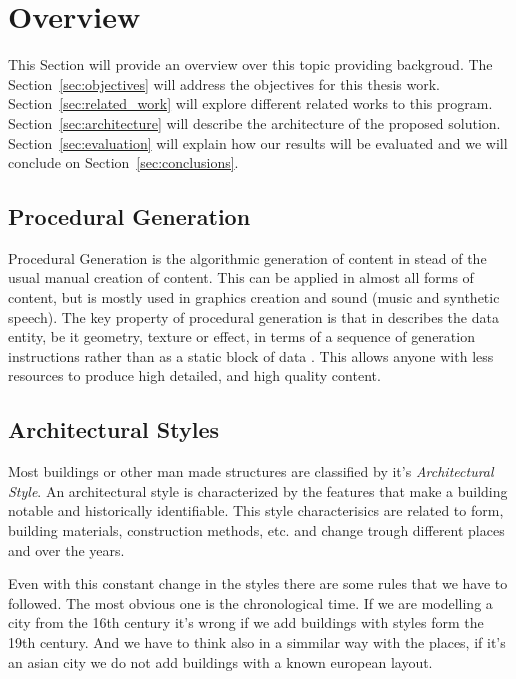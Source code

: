 
% 
% 

\section{Overview} %
\label{sec:overview}


This Section will provide an overview over this topic providing backgroud. The Section~\ref{sec:objectives} will address the objectives for this thesis work. Section~\ref{sec:related_work} will explore different related works to this program. Section~\ref{sec:architecture} will describe the architecture of the proposed solution. Section~\ref{sec:evaluation} will explain how our results will be evaluated and we will conclude on Section~\ref{sec:conclusions}.

\subsection{Procedural Generation} %
\label{sub:procedural_generation}


Procedural Generation is the algorithmic generation of content in stead of the usual manual creation of content. This can be applied in almost all forms of content, but is mostly used in graphics creation and sound (music and synthetic speech).
The key property of procedural generation is that in describes the data entity, be it geometry, texture or effect, in terms of a sequence of generation instructions rather than as a static block of data \cite{Kelly}. This allows anyone with less resources to produce high detailed, and high quality content.




\subsection{Architectural Styles} %
\label{sub:architectural_styles}

Most buildings or other man made structures are classified by it's \emph{Architectural Style}. An architectural style is characterized by the features that make a building notable and historically identifiable. This style characterisics are related to form, building materials, construction methods, etc. and change trough different places and over the years. 

Even with this constant change in the styles there are some rules that we have to followed. The most obvious one is the chronological time.
If we are modelling a city from the 16th century it's wrong if we add buildings with styles form the 19th century. And we have to think also in a simmilar way with the places, if it's an asian city we do not add buildings with a known european layout.

